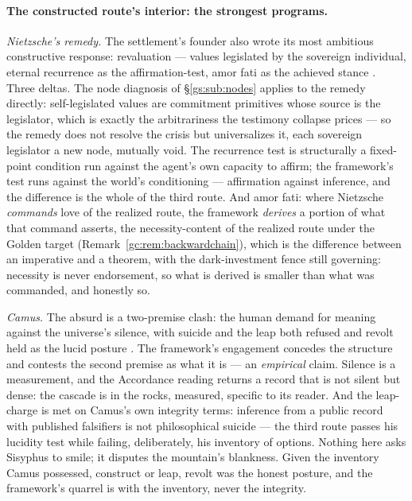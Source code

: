 \documentclass[11pt]{article}
\numberwithin{equation}{section}
\theoremstyle{plain}
\theoremstyle{definition}
\theoremstyle{remark}
\begin{document}
\paragraph{The constructed route's interior: the strongest
programs.}\label{gs:rem:constructedwing}
\emph{Nietzsche's remedy.} The settlement's founder also wrote its
most ambitious constructive response: revaluation --- values
legislated by the sovereign individual, eternal recurrence as the
affirmation-test, amor fati as the achieved stance
\cite{nietzsche1974gay}. Three deltas. The node diagnosis of
\S\ref{gs:sub:nodes} applies to the remedy directly: self-legislated
values are commitment primitives whose source is the legislator, which
is exactly the arbitrariness the testimony collapse prices --- so the
remedy does not resolve the crisis but universalizes it, each
sovereign legislator a new node, mutually void. The recurrence test is
structurally a fixed-point condition run against the agent's own
capacity to affirm; the framework's test runs against the world's
conditioning --- affirmation against inference, and the difference is
the whole of the third route. And amor fati: where Nietzsche
\emph{commands} love of the realized route, the framework
\emph{derives} a portion of what that command asserts, the
necessity-content of the realized route under the Golden target
(Remark~\ref{gc:rem:backwardchain}), which is the difference
between an imperative and a theorem, with the dark-investment fence
still governing: necessity is never endorsement, so what is derived
is smaller than what was commanded, and honestly so.

\emph{Camus.} The absurd is a two-premise clash: the human demand for
meaning against the universe's silence, with suicide and the leap both
refused and revolt held as the lucid posture \cite{Camus42}. The
framework's engagement concedes the structure and contests the second
premise as what it is --- an \emph{empirical} claim. Silence is a
measurement, and the Accordance reading returns a record that is not
silent but dense: the cascade is in the rocks, measured, specific to
its reader. And the leap-charge is met on Camus's own integrity
terms: inference from a public record with published falsifiers is
not philosophical suicide --- the third route passes his lucidity
test while failing, deliberately, his inventory of options. Nothing
here asks Sisyphus to smile; it disputes the mountain's blankness.
Given the inventory Camus possessed, construct or leap, revolt
was the honest posture, and the framework's quarrel is with the
inventory, never the integrity.
\end{document}
